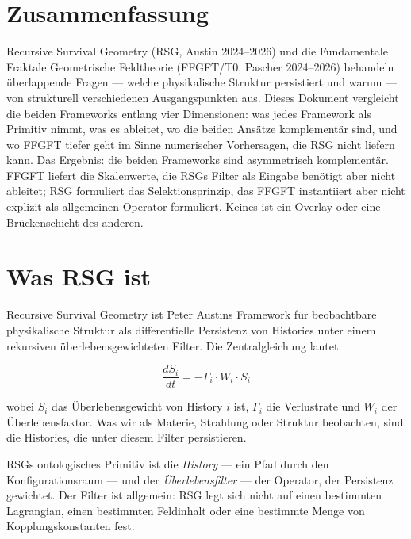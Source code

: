 
\section*{Zusammenfassung}

Recursive Survival Geometry (RSG, Austin 2024--2026) und die Fundamentale
Fraktale Geometrische Feldtheorie (FFGFT/T0, Pascher 2024--2026) behandeln
überlappende Fragen — welche physikalische Struktur persistiert und warum —
von strukturell verschiedenen Ausgangspunkten aus. Dieses Dokument vergleicht
die beiden Frameworks entlang vier Dimensionen: was jedes Framework als
Primitiv nimmt, was es ableitet, wo die beiden Ansätze komplementär sind,
und wo FFGFT tiefer geht im Sinne numerischer Vorhersagen, die RSG nicht
liefern kann. Das Ergebnis: die beiden Frameworks sind asymmetrisch
komplementär. FFGFT liefert die Skalenwerte, die RSGs Filter als Eingabe
benötigt aber nicht ableitet; RSG formuliert das Selektionsprinzip, das
FFGFT instantiiert aber nicht explizit als allgemeinen Operator formuliert.
Keines ist ein Overlay oder eine Brückenschicht des anderen.

\section{Was RSG ist}

Recursive Survival Geometry ist Peter Austins Framework für beobachtbare
physikalische Struktur als differentielle Persistenz von Histories unter
einem rekursiven überlebensgewichteten Filter. Die Zentralgleichung lautet:

\begin{equation}
  \frac{dS_i}{dt} = -\Gamma_i \cdot W_i \cdot S_i
\end{equation}

wobei $S_i$ das Überlebensgewicht von History $i$ ist, $\Gamma_i$ die
Verlustrate und $W_i$ der Überlebensfaktor. Was wir als Materie, Strahlung
oder Struktur beobachten, sind die Histories, die unter diesem Filter
persistieren.

RSGs ontologisches Primitiv ist die \emph{History} — ein Pfad durch den
Konfigurationsraum — und der \emph{Überlebensfilter} — der Operator, der
Persistenz gewichtet. Der Filter ist allgemein: RSG legt sich nicht auf
einen bestimmten Lagrangian, einen bestimmten Feldinhalt oder eine bestimmte
Menge von Kopplungskonstanten fest.

